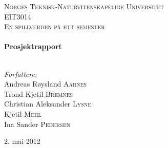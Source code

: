 \begin{titlepage}

\begin{center}
 

\textsc{\LARGE Norges Teknisk-Naturvitenskapelige Universitet}\\[1.5cm]

 
\textsc{\Large EIT3014}\\[0.5cm]

\textsc{\large En spillverden på ett semester}\\[0.5cm]
 
 
\HRule \\[0.4cm]
{ \huge \bfseries Prosjektrapport}\\[0.4cm]
 
\HRule \\[1.5cm]
 

\begin{center} \Large
\emph{Forfattere:}\\
Andreas Røysland \textsc{Aarnes}\\
Trond Kjetil \textsc{Bremnes}\\
Christian Aleksander \textsc{Lysne}\\
Kjetil \textsc{Mehl}\\
Ina Sander \textsc{Pedersen}\\ [3cm]
\end{center}
 

{\large 2. mai 2012}\\[4cm] %
 
\vfill
\end{center}
\end{titlepage}
